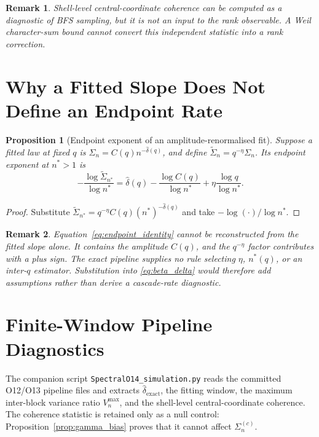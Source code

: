 \documentclass[11pt]{article}
\newtheorem{proposition}[theorem]{Proposition}
\newtheorem{remark}{Remark}
\begin{document}
  \begin{remark}
    Shell-level central-coordinate coherence can be computed as a diagnostic of BFS sampling, but it
    is not an input to the rank observable.
    A Weil character-sum bound cannot convert this independent statistic into a rank correction.
  \end{remark}

  \section{Why a Fitted Slope Does Not Define an Endpoint Rate}
  \label{sec:corrected_relation}

  \begin{proposition}[Endpoint exponent of an amplitude-renormalised fit]
    \label{thm:corrected}
    Suppose a fitted law at fixed $q$ is
    $\Sigma_n=C(q)n^{-\hat\delta(q)}$, and define
    $\widetilde\Sigma_n=q^{-\eta}\Sigma_n$.
    Its endpoint exponent at $n^*>1$ is
    \begin{equation}
      \label{eq:endpoint_identity}
      -\frac{\log\widetilde\Sigma_{n^*}}{\log n^*}
      =\hat\delta(q)-\frac{\log C(q)}{\log n^*}
      +\eta\frac{\log q}{\log n^*}.
    \end{equation}
  \end{proposition}

  \begin{proof}
    Substitute $\widetilde\Sigma_{n^*}=q^{-\eta}C(q)(n^*)^{-\hat\delta(q)}$ and take
    $-\log(\cdot)/\log n^*$.
  \end{proof}

  \begin{remark}
    Equation~\eqref{eq:endpoint_identity} cannot be reconstructed from the fitted slope alone.
    It contains the amplitude $C(q)$, and the $q^{-\eta}$ factor contributes with a plus sign.
    The exact pipeline supplies no rule selecting $\eta$, $n^*(q)$, or an inter-$q$ estimator.
    Substitution into \eqref{eq:beta_delta} would therefore add assumptions rather than derive a
    cascade-rate diagnostic.
  \end{remark}

  \section{Finite-Window Pipeline Diagnostics}
  \label{sec:numerical}

  The companion script \texttt{SpectralO14\_simulation.py} reads the committed O12/O13 pipeline
  files and extracts $\hat\delta_{\mathrm{exact}}$, the fitting window, the maximum inter-block
  variance ratio $V_n^{\max}$, and the shell-level central-coordinate coherence.
  The coherence statistic is retained only as a null control: Proposition~\ref{prop:gamma_bias}
  proves that it cannot affect $\Sigma_n^{(c)}$.
\end{document}
